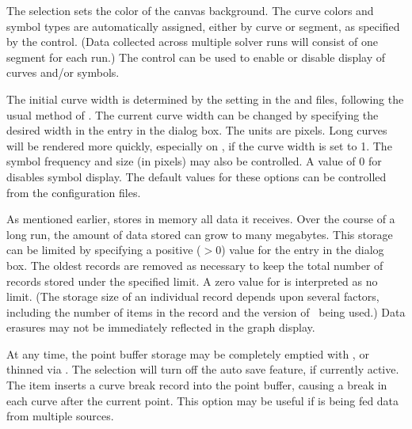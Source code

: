 The  selection sets the color of the canvas
background. The curve colors and symbol types are automatically
assigned, either by curve or segment, as specified by the  control. (Data collected across multiple solver runs will
consist of one segment for each run.) The  control can be
used to enable or disable display of curves and/or symbols.

The initial curve width is determined by the  setting in the  and
 files, following the usual method of
.  The current
curve width can be changed by specifying the desired width in the
 entry in the {} dialog
box.  The units are pixels.  Long curves will be rendered more quickly,
especially on \Windows, if the curve width is set to 1. The symbol
frequency and size (in pixels) may also be controlled. A value of 0 for
 disables symbol display. The default values for these
options can be controlled from the configuration  files. 

As mentioned earlier,  stores in memory all data it
receives.  Over the course of a long run, the amount of data stored can
grow to many megabytes.  This storage can be limited
by specifying a positive ($>0$) value for the 
entry in the {} dialog box.  The oldest
records are removed as necessary to keep the total number of records
stored under the specified limit.  A zero value for  is interpreted as no limit.  (The storage size of an individual
record depends upon several factors, including the number of items in
the record and the version of \Tcl\ being used.)  Data erasures may not
be immediately reflected in the graph display.

At any time, the point buffer storage may be completely emptied with
, or thinned via
.  The 
selection will turn off the auto save feature, if currently active.  The
 item inserts a curve break record into
the point buffer, causing a break in each curve after the current point.
This option may be useful if  is being fed data from
multiple sources.

